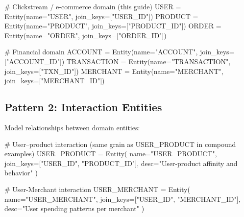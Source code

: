 \documentclass[
  letterpaper,
  DIV=11,
  numbers=noendperiod]{scrreprt}
\newenvironment{Shaded}{\begin{snugshade}}{\end{snugshade}}
\newcommand{\CommentTok}[1]{\textcolor[rgb]{0.37,0.37,0.37}{#1}}
\newcommand{\NormalTok}[1]{\textcolor[rgb]{0.00,0.23,0.31}{#1}}
\newcommand{\OperatorTok}[1]{\textcolor[rgb]{0.37,0.37,0.37}{#1}}
\newcommand{\StringTok}[1]{\textcolor[rgb]{0.13,0.47,0.30}{#1}}
\begin{document}
\begin{Shaded}
\begin{Highlighting}[]
\CommentTok{\# Clickstream / e{-}commerce domain (this guide)}
\NormalTok{USER }\OperatorTok{=}\NormalTok{ Entity(name}\OperatorTok{=}\StringTok{"USER"}\NormalTok{, join\_keys}\OperatorTok{=}\NormalTok{[}\StringTok{"USER\_ID"}\NormalTok{])}
\NormalTok{PRODUCT }\OperatorTok{=}\NormalTok{ Entity(name}\OperatorTok{=}\StringTok{"PRODUCT"}\NormalTok{, join\_keys}\OperatorTok{=}\NormalTok{[}\StringTok{"PRODUCT\_ID"}\NormalTok{])}
\NormalTok{ORDER }\OperatorTok{=}\NormalTok{ Entity(name}\OperatorTok{=}\StringTok{"ORDER"}\NormalTok{, join\_keys}\OperatorTok{=}\NormalTok{[}\StringTok{"ORDER\_ID"}\NormalTok{])}

\CommentTok{\# Financial domain}
\NormalTok{ACCOUNT }\OperatorTok{=}\NormalTok{ Entity(name}\OperatorTok{=}\StringTok{"ACCOUNT"}\NormalTok{, join\_keys}\OperatorTok{=}\NormalTok{[}\StringTok{"ACCOUNT\_ID"}\NormalTok{])}
\NormalTok{TRANSACTION }\OperatorTok{=}\NormalTok{ Entity(name}\OperatorTok{=}\StringTok{"TRANSACTION"}\NormalTok{, join\_keys}\OperatorTok{=}\NormalTok{[}\StringTok{"TXN\_ID"}\NormalTok{])}
\NormalTok{MERCHANT }\OperatorTok{=}\NormalTok{ Entity(name}\OperatorTok{=}\StringTok{"MERCHANT"}\NormalTok{, join\_keys}\OperatorTok{=}\NormalTok{[}\StringTok{"MERCHANT\_ID"}\NormalTok{])}
\end{Highlighting}
\end{Shaded}

\hypertarget{pattern-2-interaction-entities}{%
\subsection{Pattern 2: Interaction
Entities}\label{pattern-2-interaction-entities}}

Model relationships between domain entities:

\begin{Shaded}
\begin{Highlighting}[]
\CommentTok{\# User–product interaction (same grain as USER\_PRODUCT in compound examples)}
\NormalTok{USER\_PRODUCT }\OperatorTok{=}\NormalTok{ Entity(}
\NormalTok{    name}\OperatorTok{=}\StringTok{"USER\_PRODUCT"}\NormalTok{,}
\NormalTok{    join\_keys}\OperatorTok{=}\NormalTok{[}\StringTok{"USER\_ID"}\NormalTok{, }\StringTok{"PRODUCT\_ID"}\NormalTok{],}
\NormalTok{    desc}\OperatorTok{=}\StringTok{"User{-}product affinity and behavior"}
\NormalTok{)}

\CommentTok{\# User{-}Merchant interaction}
\NormalTok{USER\_MERCHANT }\OperatorTok{=}\NormalTok{ Entity(}
\NormalTok{    name}\OperatorTok{=}\StringTok{"USER\_MERCHANT"}\NormalTok{,}
\NormalTok{    join\_keys}\OperatorTok{=}\NormalTok{[}\StringTok{"USER\_ID"}\NormalTok{, }\StringTok{"MERCHANT\_ID"}\NormalTok{],}
\NormalTok{    desc}\OperatorTok{=}\StringTok{"User spending patterns per merchant"}
\NormalTok{)}
\end{Highlighting}
\end{Shaded}
\end{document}

